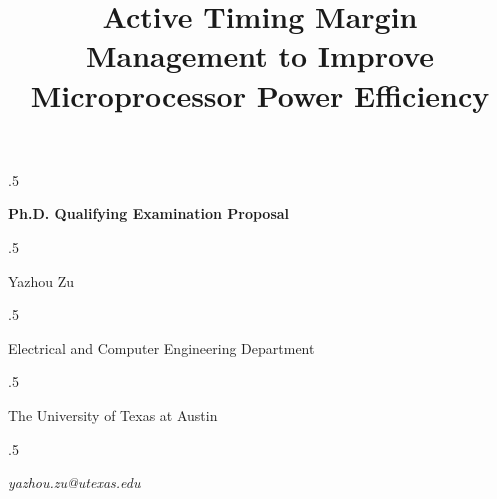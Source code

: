 

\thispagestyle{empty}

\title{\Large\bf Active Timing Margin Management to Improve \\Microprocessor Power Efficiency}

\date{}
\maketitle

\vspace*{-30pt}
\moveleft.5\hoffset\centerline{\bf Ph.D. Qualifying Examination Proposal}
\vspace*{15pt}

\moveleft.5\hoffset\centerline{Yazhou Zu}
\vspace*{15pt}

\moveleft.5\hoffset\centerline{Electrical and Computer Engineering Department}
\moveleft.5\hoffset\centerline{The University of Texas at Austin}
\moveleft.5\hoffset\centerline{\textit{yazhou.zu@utexas.edu}}

\vspace*{5pt}
